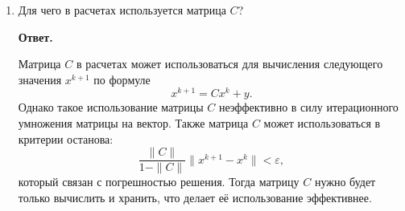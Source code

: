 \documentclass{article}
\begin{document}
\begin{enumerate}
        \item Для чего в расчетах используется матрица $C$?
        
        {\bfseries Ответ. }

        Матрица $C$ в расчетах может использоваться для вычисления следующего значения $x^{k+1}$ по формуле
        \begin{equation*}
            x^{k+1} = C x^k +y.
        \end{equation*}
        Однако такое использование матрицы $C$ неэффективно в силу итерационного умножения матрицы на вектор.
        Также матрица $C$ может использоваться в критерии останова: 
        \begin{equation*}
            \dfrac{\|C\|}{1-\|C\|} \|x^{k+1} - x^k\| < \varepsilon,
        \end{equation*}
        который связан с погрешностью решения. Тогда матрицу $C$ нужно будет только вычислить и хранить, что делает 
        её использование эффективнее.
    \end{enumerate}
\end{document}
